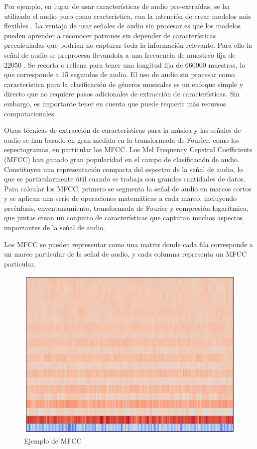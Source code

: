 \documentclass[colorinlistoftodos,twoside,twocolumn,10pt]{article} %
\begin{document}
 Por ejemplo, en lugar de usar caracter\'isticas de audio pre-extra\'idas, se ha utilizado el audio puro como cracter\'istica, con la intenci\'on de crear modelos m\'as flexibles \cite{Conv1D}. La ventaja de usar señales de audio sin procesar es que los modelos pueden aprender a reconocer patrones sin depender de características precalculadas que podr\'ian no capturar toda la información relevante. Para ello la señal de audio se preprocesa llevandola a una frecuencia de muestreo fija de 22050 . Se recorta o rellena para tener una longitud fija de 660000 muestras, lo que corresponde a 15 segundos de audio. 
 El uso de audio sin procesar como característica para la clasificación de géneros musicales es un enfoque simple y directo que no requiere pasos adicionales de extracción de características. Sin embargo, es importante tener en cuenta que puede requerir más recursos computacionales.
 
 Otras t\'ecnicas de extracci\'on de caracter\'isticas para la m\'usica y las se\~nales de audio se han basado en gran medida en la transformada de Fourier, como los espectogramas, en particular los MFCC. Los Mel Frequency Cepstral Coefficients (MFCC) han ganado gran popularidad en el campo de clasificaci\'on de audio. Constituyen una representaci\'on compacta del espectro de la se\~nal de audio, lo que es particularmente \'util cuando se trabaja con grandes cantidades de datos. Para calcular los MFCC, primero se segmenta la se\~nal de audio en marcos cortos y se aplican una serie de operaciones matem\'aticas a cada marco, incluyendo pre\'enfasis, enventanamiento, transformada de Fourier y compresi\'on logar\'itmica, que juntas crean un conjunto de caracter\'isticas que capturan muchos aspectos importantes de la se\~nal de audio\cite{mfcc wikipedia}. 

Los MFCC se pueden representar como una matriz donde cada fila corresponde a un marco particular de la se\~nal de audio, y cada columna representa un MFCC particular. 
\begin{figure}[hbtp]
\centering
\includegraphics[width=0.9\linewidth]{mfcc.png}
\caption{Ejemplo de MFCC}
\end{figure}
\end{document}
